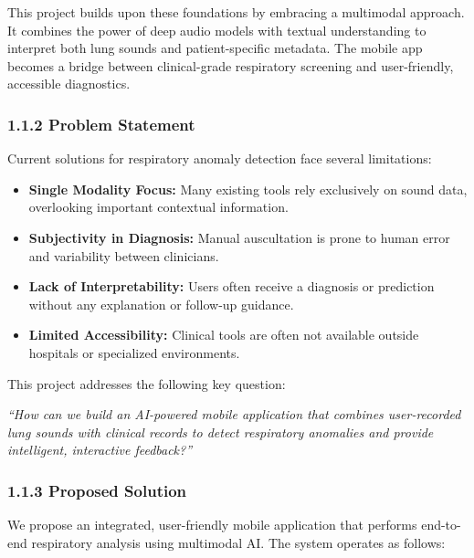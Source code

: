 This project builds upon these foundations by embracing a multimodal approach. It combines the power of deep audio models with textual understanding to interpret both lung sounds and patient-specific metadata. The mobile app becomes a bridge between clinical-grade respiratory screening and user-friendly, accessible diagnostics.

\subsubsection*{1.1.2 Problem Statement}

Current solutions for respiratory anomaly detection face several limitations:
\begin{itemize}
    \item \textbf{Single Modality Focus:} Many existing tools rely exclusively on sound data, overlooking important contextual information.
    \item \textbf{Subjectivity in Diagnosis:} Manual auscultation is prone to human error and variability between clinicians.
    \item \textbf{Lack of Interpretability:} Users often receive a diagnosis or prediction without any explanation or follow-up guidance.
    \item \textbf{Limited Accessibility:} Clinical tools are often not available outside hospitals or specialized environments.
\end{itemize}

This project addresses the following key question:

\textit{“How can we build an AI-powered mobile application that combines user-recorded lung sounds with clinical records to detect respiratory anomalies and provide intelligent, interactive feedback?”}

\subsubsection*{1.1.3 Proposed Solution}

We propose an integrated, user-friendly mobile application that performs end-to-end respiratory analysis using multimodal AI. The system operates as follows:

